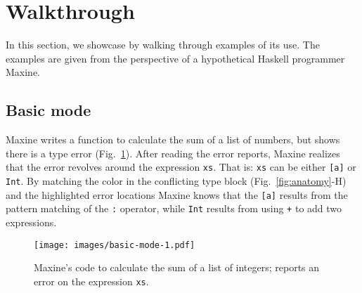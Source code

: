 \section{Walkthrough} \label{sec:walkthrough}
In this section, we showcase \chameleon{} by walking through examples of its
use. The examples are given from the perspective of a hypothetical Haskell 
programmer Maxine. 


\subsection{Basic mode} \label{sub:basic}
Maxine writes a function to calculate the sum of a list of
numbers, but \chameleon{} shows there is a type error (Fig.~\ref{fig:basic-mode-1}). 
After reading the error reports, Maxine realizes that the error revolves 
around the expression \texttt{xs}. That is: \texttt{xs} can be
either \texttt{[a]} or \texttt{Int}. By matching the color in the
conflicting type block (Fig.~\ref{fig:anatomy}-H) and the highlighted error locations 
Maxine knows that the \texttt{[a]} results from the pattern matching of the
\texttt{:} operator, while \texttt{Int} results from using \texttt{+} to
 add two expressions. 

\begin{figure}[ht]
        \centering
    \texttt{[image: images/basic-mode-1.pdf]}
        \caption[\chameleon{} walkthrough - basic mode]{
            Maxine's code to calculate the sum of a list of integers;
            \chameleon{} reports an error on the expression \texttt{xs}.
            }
            \label{fig:basic-mode-1}
\end{figure}







